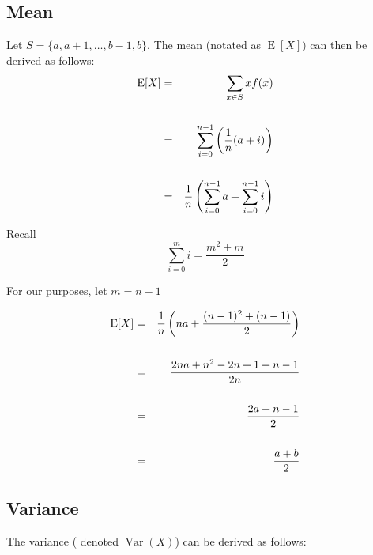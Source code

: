 \subsection*{Mean}
Let $S=\{a,a+1,\ldots,b-1,b\}$. The mean (notated as $\operatorname{E}[X])$ can then be derived as follows:
\begin{eqnarray*}
\operatorname{E}[X] &=& \sum_{x\in S} x f(x)\\
& & \\
&=&\sum^{n-1}_{i=0}\left(\frac{1}{n}(a+i)\right)\\
& & \\
&=& {1 \over n}\left( \sum^{n-1}_{i=0} a + \sum^{n-1}_{i=0} i\right)\\
\end{eqnarray*}

\begin{framed}
Recall \[\sum^{m}_{i=0}i = \frac{m^2 + m}{2}\]
\medskip

For our purposes, let $m =n-1$
\end{framed}
\begin{eqnarray*}
\operatorname{E}[X]&=& {1 \over n}\left( na + {(n-1)^2+(n-1) \over 2} \right)\\
& & \\&=& {2na + n^2-2n+1+n-1 \over 2n}\\
& & \\&=& {2a + n-1 \over 2}\\
& & \\&=& {a + b \over 2}\\
\end{eqnarray*}

\newpage 
\subsection*{Variance}
The variance ( denoted $\operatorname{Var}(X)$) can be derived as follows:



